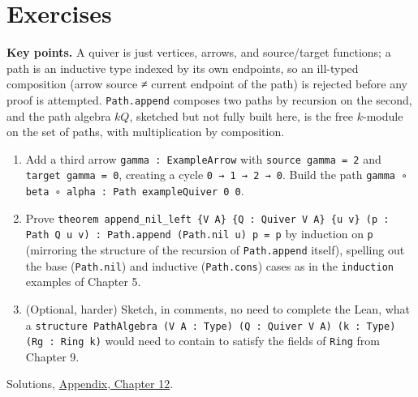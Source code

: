 \section{Exercises}\label{sec:12-path-algebras:06-exercises:1}

\textbf{Key points.} A quiver is just vertices, arrows, and source/target functions; a path is an inductive type indexed by its own endpoints, so an ill-typed composition (arrow source ≠ current endpoint of the path) is rejected before any proof is attempted. \texttt{Path.append} composes two paths by recursion on the second, and the path algebra \(kQ\), sketched but not fully built here, is the free \(k\)-module on the set of paths, with multiplication by composition.

\begin{enumerate}
\def\labelenumi{\arabic{enumi}.}
\tightlist
\item
  Add a third arrow \texttt{gamma : ExampleArrow} with \texttt{source gamma = 2} and \texttt{target gamma = 0}, creating a cycle \texttt{0 → 1 → 2 → 0}. Build the path \texttt{gamma ∘ beta ∘ alpha : Path exampleQuiver 0 0}.
\item
  Prove \texttt{theorem append\_\allowbreak{}nil\_\allowbreak{}left \{V A\} \{Q : Quiver V A\} \{u v\} (p : Path Q u v) : Path.append (Path.nil u) p = p} by induction on \texttt{p} (mirroring the structure of the recursion of \texttt{Path.append} itself), spelling out the base (\texttt{Path.nil}) and inductive (\texttt{Path.cons}) cases as in the \texttt{induction} examples of Chapter 5.
\item
  (Optional, harder) Sketch, in comments, no need to complete the Lean, what a \texttt{structure PathAlgebra (V A : Type) (Q : Quiver V A) (k : Type) (Rg : Ring k)} would need to contain to satisfy the fields of \texttt{Ring} from Chapter 9.
\end{enumerate}

Solutions, \hyperref[sec:15-appendix-solutions:12-chapter-12:1]{Appendix, Chapter 12}.

